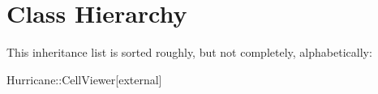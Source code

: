 \section{Class Hierarchy}
This inheritance list is sorted roughly, but not completely, alphabetically\-:\begin{DoxyCompactList}
\item Hurricane\-:\-:Cell\-Viewer{\ttfamily  \mbox{[}external\mbox{]}}\begin{DoxyCompactList}
\item {}
\end{DoxyCompactList}
\end{DoxyCompactList}
